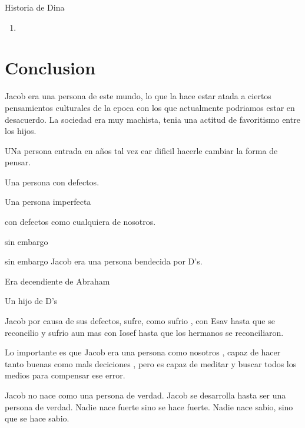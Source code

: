 \documentclass[conference]{IEEEtran}
\begin{document}
\item
Historia de Dina







\begin{enumerate}
 \item
\end{enumerate}




\section{Conclusion}

Jacob era una persona de este mundo, lo que la hace estar atada a ciertos pensamientos 
culturales de la epoca con los que actualmente podriamos estar en desacuerdo.
La sociedad era muy machista, tenia una actitud de favoritismo entre los hijos.


UNa persona entrada en años tal vez ear dificil hacerle cambiar la forma de pensar.

Una persona con defectos.



Una persona imperfecta

con defectos como cualquiera de nosotros. 

sin embargo

sin embargo Jacob era una persona bendecida por D's.

Era decendiente de Abraham 


Un hijo de D's

Jacob por causa de sus defectos, sufre, como sufrio , con Esav hasta que se reconcilio y sufrio aun mas con Iosef
hasta que los hermanos se reconciliaron.





Lo importante es que Jacob era una persona como nosotros , capaz de hacer tanto buenas como mals deciciones , pero es capaz de meditar y buscar todos los medios para compensar ese error. 

Jacob no nace como una persona de verdad.
Jacob se desarrolla hasta ser una persona de verdad.
Nadie nace fuerte sino se hace fuerte.
Nadie nace sabio, sino que se hace sabio.





\end{document}
